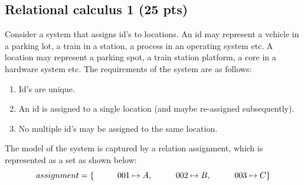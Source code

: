 \documentclass[12pt]{article}
\begin{document}
\subsection{Relational calculus 1 (25 pts)}
Consider a system that assigns id’s to locations. An id may represent a vehicle in a parking
lot, a train in a station, a process in an operating system etc. A location may represent a
parking spot, a train station platform, a core in a hardware system etc. The requirements
of the system are as follows:
\begin{enumerate}
	\item Id’s are unique.
	\item An id is assigned to a single location (and maybe re-assigned subsequently).
	\item No multiple id’s may be assigned to the same location.
\end{enumerate}
The model of the system is captured by a relation assignment, which is represented as a set
as shown below:
\[
assignment = \\
\{ \\
\hspace{10mm} 001 \mapsto A,\\
\hspace{10mm} 002 \mapsto B,\\
\hspace{10mm} 003 \mapsto C\\
\}
\]
\end{document}
